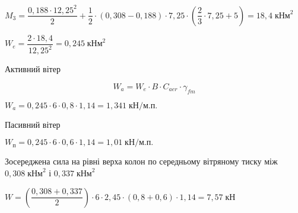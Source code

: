 \documentclass[a4paper,14pt]{article}
\begin{document}
$M_3 = \dfrac{0,188\cdot 12,25^2}{2}+\dfrac {1}{2}\cdot (0,308-0,188)\cdot 7,25 \cdot \left(\dfrac {2}{3}\cdot 7,25 + 5\right)= 18,4\;\textit{кНм}^2$ 

$W_\textit{e}= \dfrac{2\cdot 18,4}{12,25^2}= 0,245\;\textit{кНм}^2$ 

Активний вітер 

\begin{equation}
    W_\textit{a}= W_\textit{e} \cdot B\cdot C_{aer}\cdot \gamma_{fm} 
\end{equation}

$W_\textit{a}= 0,245 \cdot 6\cdot 0,8\cdot 1,14 = 1,341\;\textit{кН/м.п.}$   

Пасивний вітер

$W_\textit{п}= 0,245 \cdot 6\cdot 0,6\cdot 1,14 = 1,01\;\textit{кН/м.п.}$ 

Зосереджена сила на рівні верха колон по середньому вітряному тиску між $0,308\;\textit{кНм}^2$ і $0,337\;\textit{кНм}^2$

$W = \left(\dfrac{0,308+0,337}{2}\right)\cdot 6 \cdot 2,45 \cdot (0,8+0,6)\cdot 1,14 = 7,57\;\textit{кН}$ 
\end{document}
